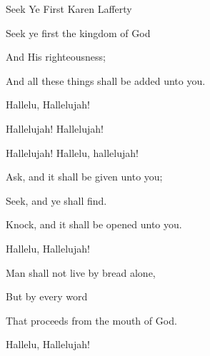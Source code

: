 \documentclass[12pt]{book}
\begin{document}
\begin{song}{Seek Ye First}{}
  {}
  {Karen Lafferty}
  {}
  {}

  \begin{SBVerse}
    Seek ye first the kingdom of God

    And His righteousness;

    And all these things shall be added unto you.

    Hallelu, Hallelujah!
  \end{SBVerse}

  \begin{SBOpGroup}
    Hallelujah! Hallelujah!

    Hallelujah! Hallelu, hallelujah!
  \end{SBOpGroup}

  \begin{SBVerse}
    Ask, and it shall be given unto you;

    Seek, and ye shall find.

    Knock, and it shall be opened unto you.

    Hallelu, Hallelujah!
  \end{SBVerse}

  \begin{SBVerse}
    Man shall not live by bread alone,

    But by every word

    That proceeds from the mouth of God.

    Hallelu, Hallelujah!
  \end{SBVerse}
\end{song}
\end{document}

